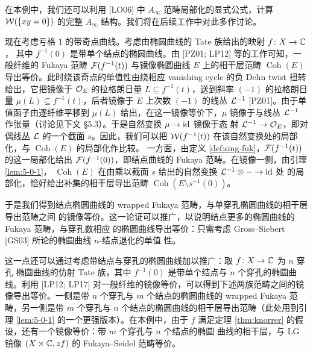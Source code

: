 
在本例中，我们还可以利用 [LO06] 中 $A_\infty$ 范畴局部化的显式公式，计算
$\mathcal{W}(\{xy=0\})$ 的完整 $A_\infty$ 结构。我们将在后续工作中对此多作讨论。

现在考虑亏格 $1$ 的带奇点曲线。考虑由椭圆曲线的 Tate 族给出的映射 $f\colon X\to\mathbb{C}$，
其中 $f^{-1}(0)$ 是带单个结点的椭圆曲线。由 [PZ01; LP12] 等的工作可知，一般纤维的
Fukaya 范畴 $\mathcal{F}(f^{-1}(t))$ 与镜像椭圆曲线 $E$ 上的相干层范畴
$\operatorname{Coh}(E)$ 导出等价。此时绕该奇点的单值性由绕相应 vanishing cycle 的负
Dehn twist 扭转给出，它把镜像于 $\mathcal{O}_E$ 的拉格朗日量 $L\subseteq f^{-1}(t)$，送到斜率
$(-1)$ 的拉格朗日量 $\mu(L)\subseteq f^{-1}(t)$，后者镜像于 $E$ 上次数 $(-1)$ 的线丛
$\mathcal{L}^{-1}$ [PZ01]。由于单值函子由逐纤维平移到 $\mu(L)$ 给出，在这一镜像等价下，$\mu$
镜像于与线丛 $\mathcal{L}^{-1}$ 作张量（讨论见下文 §5.3）。于是自然变换 $\mu\to\mathrm{id}$ 镜像于态
射 $\mathcal{L}^{-1}\to\mathcal{O}_E$，即对偶线丛 $\mathcal{L}$ 的一个截面 $s$。因此，我们可以把
$\mathcal{W}(f^{-1}(t))$ 在该自然变换处的局部化，与 $\operatorname{Coh}(E)$ 的局部化作比较。
一方面，由定义 \ref{def:sing-fuk}，$\mathcal{F}(f^{-1}(t))$ 的这一局部化给出
$\mathcal{F}(f^{-1}(0))$，即结点曲线的 Fukaya 范畴。在镜像一侧，由引理 \ref{lem:5-0-1}，
$\operatorname{Coh}(E)$ 在由乘以截面 $s$ 给出的自然变换 $\mathcal{L}^{-1}\otimes-\to\mathrm{id}$ 处
的局部化，恰好给出补集的相干层导出范畴 $\operatorname{Coh}(E\setminus s^{-1}(0))$。


于是我们得到结点椭圆曲线的 wrapped Fukaya 范畴，与单穿孔椭圆曲线的相干层导出范畴之间
的镜像等价。这一论证可以推广，以说明结点更多的椭圆曲线的 Fukaya 范畴，与穿孔数相应
的椭圆曲线导出等价：只需考虑 Gross--Siebert [GS03] 所论的椭圆曲线 $n$-结点退化的单值
性。

这一点还可以通过考虑带结点与穿孔的椭圆曲线加以推广：取 $f\colon X\to\mathbb{C}$ 为 $n$ 穿孔
椭圆曲线的仿射 Tate 族，其中 $f^{-1}(0)$ 是带单个结点与 $n$ 个穿孔的椭圆曲线。利用
[LP12; LP17] 对一般纤维的镜像等价，可以得到下述两族范畴之间的镜像导出等价。一侧是带
$n$ 个穿孔与 $m$ 个结点的椭圆曲线的 wrapped Fukaya 范畴，另一侧是带 $m$ 个穿孔与 $n$
个结点的椭圆曲线的相干层导出范畴（此处用到引理 \ref{lem:5-0-1} 的一个更强版本）。在本例中，由于 $f$
满足定理 \ref{thm:knorrer} 的假设，还有一个镜像等价：带 $m$ 个穿孔与 $n$ 个结点的椭圆
曲线的相干层，与 LG 镜像 $(X\times\mathbb{C},zf)$ 的 Fukaya--Seidel 范畴等价。

